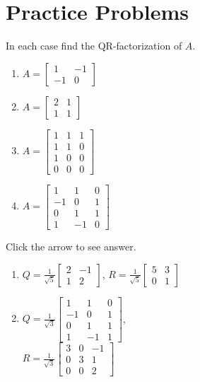 \documentclass{ximera}
\begin{document}
\section*{Practice Problems}

\begin{problem}\label{prob:findQR}
In each case find the QR-factorization of $A$.

\begin{enumerate}
\item $A = \left[ \begin{array}{rr}
1 & -1 \\
-1 & 0
\end{array}\right]$
\item $A = \left[ \begin{array}{rr}
2 & 1 \\
1 &1
\end{array}\right]$
\item $A = \left[ \begin{array}{rrr}
1 & 1 & 1 \\
1 & 1 & 0 \\
1 & 0 & 0 \\
0 & 0 & 0
\end{array}\right]$
\item $A = \left[ \begin{array}{rrr}
1 & 1 & 0 \\
-1 & 0 & 1 \\
0 & 1 & 1 \\
1 & -1 & 0
\end{array}\right]$
\end{enumerate}
Click the arrow to see answer.
\begin{expandable}{}{}
\begin{enumerate} 
\item  $Q = \frac{1}{\sqrt{5}}\left[ \begin{array}{rr}
2 & -1 \\
1 & 2
\end{array}\right]$,
 $R = \frac{1}{\sqrt{5}}\left[ \begin{array}{rr}
5 & 3 \\
0 & 1
\end{array}\right]$

\item  $Q = \frac{1}{\sqrt{3}}\left[ \begin{array}{rrr}
1 & 1 & 0 \\
-1 & 0 & 1 \\
0 & 1 & 1 \\
1 & -1 & 1
\end{array}\right]$, \\
$R = \frac{1}{\sqrt{3}}\left[ \begin{array}{rrr}
3 & 0 & -1 \\
0 & 3 & 1 \\
0 & 0 & 2
\end{array}\right]$

\end{enumerate}
\end{expandable}
\end{problem}
\end{document}
